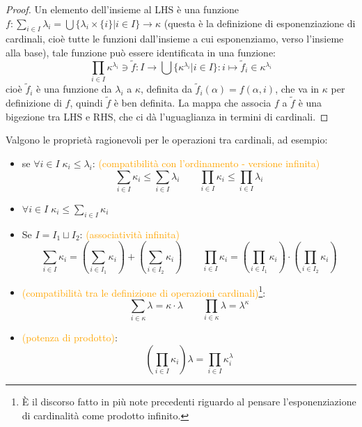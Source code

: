 \documentclass[11pt]{scrartcl}
\begin{document}
\begin{proof}
	Un elemento dell'insieme al LHS è una funzione $f : \sum_{i \in I} \lambda_i = \bigcup\{\lambda_i \times \{i\} | i \in I\} \rightarrow \kappa$ (questa è la definizione di esponenziazione di cardinali, cioè tutte le funzioni dall'insieme
	a cui esponenziamo, verso l'insieme alla base), tale funzione può essere identificata in una funzione:
	\[ \prod_{i \in I}\kappa^{\lambda_i}\ni\widetilde{f} : I \rightarrow \bigcup\{\kappa^{\lambda_i} | i \in I\} : i \mapsto \widetilde{f}_i \in \kappa^{\lambda_i}
		\]
	cioè $\widetilde{f}_i$ è una funzione da $\lambda_i$ a $\kappa$, definita da $\widetilde{f}_i(\alpha) = f(\alpha,i)$, che va in $\kappa$ per definizione di $f$, quindi $\widetilde{f}$ è ben definita. La mappa che associa $f$ a $\widetilde{f}$ è una bigezione tra LHS e RHS, che ci dà l'uguaglianza in termini di cardinali.
\end{proof}
\pagebreak
\begin{exercise}
	Valgono le proprietà ragionevoli per le operazioni tra cardinali, ad esempio:
	\begin{itemize}
		\item se $\forall i \in I \; \kappa_i \leq \lambda_i$: \textcolor{orange}{(compatibilità con l'ordinamento - versione infinita)}
		\[ \sum_{i \in I} \kappa_i \leq \sum_{i \in I} \lambda_i \qquad \prod_{i \in I} \kappa_i \leq \prod_{i \in I} \lambda_i
			\]
		\item $\forall i \in I \; \kappa_i \leq \sum_{i \in I} \kappa_i$
		\item Se $I = I_1 \sqcup I_2$: \textcolor{orange}{(associatività infinita)}
		\[ \sum_{i \in I} \kappa_i = \left(\sum_{i \in I_1} \kappa_i\right) + \left(\sum_{i \in I_2} \kappa_i\right) \qquad \prod_{i \in I}\kappa_i = \left(\prod_{i \in I_1} \kappa_i\right)\cdot\left(\prod_{i \in I_2} \kappa_i\right)
			\]
		\item \textcolor{orange}{(compatibilità tra le definizione di operazioni cardinali)}\footnote{È il discorso fatto in più note precedenti riguardo al pensare l'esponenziazione di cardinalità come prodotto infinito.}:
		\[ \sum_{i \in \kappa} \lambda = \kappa \cdot \lambda \qquad \prod_{i \in \kappa} \lambda = \lambda^\kappa
			\]
		\item \textcolor{orange}{(potenza di prodotto)}:
		\[ \left(\prod_{i \in I}\kappa_i\right)\lambda = \prod_{i \in I} \kappa_i^\lambda
			\]
	\end{itemize}
\end{exercise}
\end{document}
